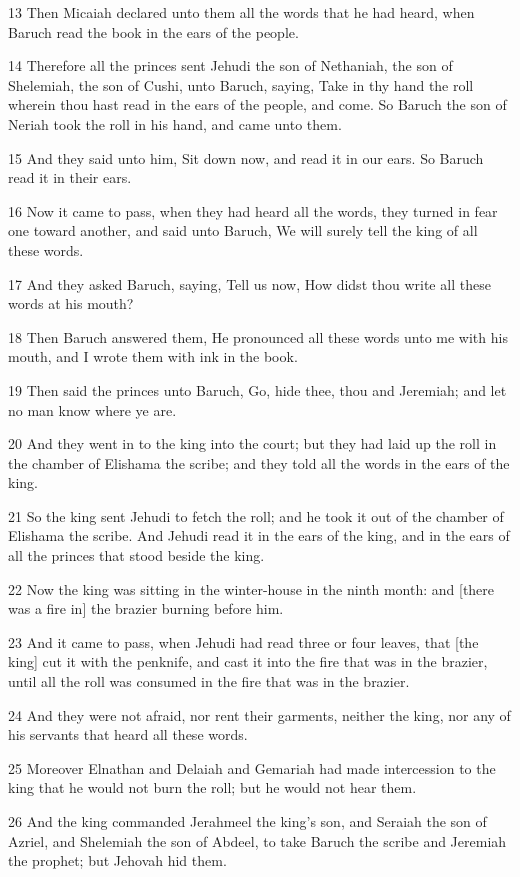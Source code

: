 \par 13 Then Micaiah declared unto them all the words that he had heard, when Baruch read the book in the ears of the people.
\par 14 Therefore all the princes sent Jehudi the son of Nethaniah, the son of Shelemiah, the son of Cushi, unto Baruch, saying, Take in thy hand the roll wherein thou hast read in the ears of the people, and come. So Baruch the son of Neriah took the roll in his hand, and came unto them.
\par 15 And they said unto him, Sit down now, and read it in our ears. So Baruch read it in their ears.
\par 16 Now it came to pass, when they had heard all the words, they turned in fear one toward another, and said unto Baruch, We will surely tell the king of all these words.
\par 17 And they asked Baruch, saying, Tell us now, How didst thou write all these words at his mouth?
\par 18 Then Baruch answered them, He pronounced all these words unto me with his mouth, and I wrote them with ink in the book.
\par 19 Then said the princes unto Baruch, Go, hide thee, thou and Jeremiah; and let no man know where ye are.
\par 20 And they went in to the king into the court; but they had laid up the roll in the chamber of Elishama the scribe; and they told all the words in the ears of the king.
\par 21 So the king sent Jehudi to fetch the roll; and he took it out of the chamber of Elishama the scribe. And Jehudi read it in the ears of the king, and in the ears of all the princes that stood beside the king.
\par 22 Now the king was sitting in the winter-house in the ninth month: and [there was a fire in] the brazier burning before him.
\par 23 And it came to pass, when Jehudi had read three or four leaves, that [the king] cut it with the penknife, and cast it into the fire that was in the brazier, until all the roll was consumed in the fire that was in the brazier.
\par 24 And they were not afraid, nor rent their garments, neither the king, nor any of his servants that heard all these words.
\par 25 Moreover Elnathan and Delaiah and Gemariah had made intercession to the king that he would not burn the roll; but he would not hear them.
\par 26 And the king commanded Jerahmeel the king's son, and Seraiah the son of Azriel, and Shelemiah the son of Abdeel, to take Baruch the scribe and Jeremiah the prophet; but Jehovah hid them.
